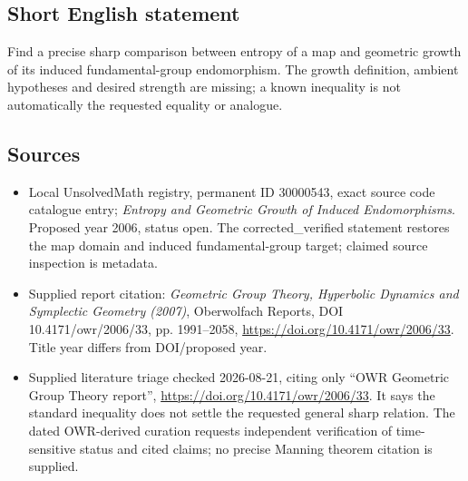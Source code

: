 \documentclass[11pt]{article}
\begin{document}
\subsection{Short English statement}
Find a precise sharp comparison between entropy of a map and geometric growth of its induced fundamental-group endomorphism. The growth definition, ambient hypotheses and desired strength are missing; a known inequality is not automatically the requested equality or analogue.
\subsection{Sources}
\begin{itemize}
\item Local UnsolvedMath registry, permanent ID 30000543, exact source code catalogue entry; \emph{Entropy and Geometric Growth of Induced Endomorphisms}. Proposed year 2006, status open. The corrected\_verified statement restores the map domain and induced fundamental-group target; claimed source inspection is metadata.
\item Supplied report citation: \emph{Geometric Group Theory, Hyperbolic Dynamics and Symplectic Geometry (2007)}, Oberwolfach Reports, DOI 10.4171/owr/2006/33, pp. 1991--2058, \url{https://doi.org/10.4171/owr/2006/33}. Title year differs from DOI/proposed year.
\item Supplied literature triage checked 2026-08-21, citing only ``OWR Geometric Group Theory report'', \url{https://doi.org/10.4171/owr/2006/33}. It says the standard inequality does not settle the requested general sharp relation. The dated OWR-derived curation requests independent verification of time-sensitive status and cited claims; no precise Manning theorem citation is supplied.
\end{itemize}
\end{document}
